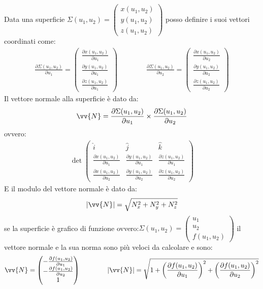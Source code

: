 \documentclass[a4paper, oneside]{article}
\newcommand\de{\partial}
\begin{document}
Data una superficie $\Sigma(u_1, u_2) = \begin{pmatrix}
    x(u_1, u_2) \\
    y(u_1, u_2) \\
    z(u_1, u_2)
\end{pmatrix}$ posso definire i suoi vettori coordinati come:
\begin{gather*}
    \frac{\de \Sigma (u_1, u_2)}{\de u_1} = \begin{pmatrix}
        \frac{\de x(u_1, u_2)}{\de u_1} \\
        \frac{\de y(u_1, u_2)}{\de u_1} \\
        \frac{\de z(u_1, u_2)}{\de u_1}
    \end{pmatrix}
    \qquad\qquad
    \frac{\de \Sigma (u_1, u_2)}{\de u_2} = \begin{pmatrix}
        \frac{\de x(u_1, u_2)}{\de u_2} \\
        \frac{\de y(u_1, u_2)}{\de u_2} \\
        \frac{\de z(u_1, u_2)}{\de u_2}
    \end{pmatrix}
\end{gather*}
Il vettore normale alla superficie è dato da:
\begin{gather*}
    \vv{N} = \frac{\de \Sigma (u_1, u_2)}{\de u_1} \times \frac{\de \Sigma (u_1, u_2)}{\de u_2}
\end{gather*}
ovvero:
\begin{gather*}
    \det\begin{pmatrix}
    \hat{i} & \hat{j} & \hat{k} \\
    \frac{\de x(u_1, u_2)}{\de u_1} & \frac{\de y(u_1, u_2)}{\de u_1} & \frac{\de z(u_1, u_2)}{\de u_1} \\
    \frac{\de x(u_1, u_2)}{\de u_2} & \frac{\de y(u_1, u_2)}{\de u_2} & \frac{\de z(u_1, u_2)}{\de u_2}
    \end{pmatrix}
\end{gather*}
E il modulo del vettore normale è dato da:
\begin{gather*}
    |\vv{N}| = \sqrt{N_x^2 + N_y^2 + N_z^2}
\end{gather*}
se la superficie è grafico di funzione ovvero:$\Sigma(u_1,u_2)=\begin{pmatrix}
    u_1 \\
    u_2 \\
    f(u_1, u_2)
\end{pmatrix}$ il vettore normale e la sua norma sono più veloci da calcolare e sono:
\begin{gather*}
    \vv{N} = \begin{pmatrix}
        -\frac{\de f(u_1, u_2)}{\de u_1} \\
        -\frac{\de f(u_1, u_2)}{\de u_2} \\
        1
    \end{pmatrix}
    \qquad\qquad
    |\vv{N}| = \sqrt{1 + \left(\frac{\de f(u_1, u_2)}{\de u_1}\right)^2 + \left(\frac{\de f(u_1, u_2)}{\de u_2}\right)^2}
\end{gather*}
\end{document}

